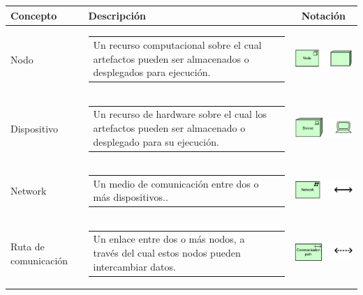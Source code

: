 \begin{longtable}[c]{|p{2.55cm}|l|c|}
	\hline
	\textbf{Concepto} 			& \textbf{Descripción}                                                                                                                                            & \textbf{Notación} \\ \hline
	\endhead
	Nodo  						& \begin{tabular}[c]{p{7cm}@{}l@{}}Un recurso computacional sobre el cual artefactos pueden ser almacenados o desplegados para ejecución.\end{tabular}                                                    & \includegraphics[width=35mm]{arquitectura/adm_lenguaje/imgs/technology/Node}           \\ \hline
	Dispositivo    				& \begin{tabular}[c]{p{7cm}@{}l@{}}Un recurso de hardware sobre el cual los artefactos pueden ser almacenado o desplegado para su ejecución.\end{tabular} & \includegraphics[width=35mm]{arquitectura/adm_lenguaje/imgs/technology/Device}          \\ \hline
	Network  					& \begin{tabular}[c]{p{7cm}@{}l@{}}Un medio de comunicación entre dos o más dispositivos..\end{tabular} & \includegraphics[width=35mm]{arquitectura/adm_lenguaje/imgs/technology/Network}          \\ \hline
	Ruta de comunicación		& \begin{tabular}[c]{p{7cm}@{}l@{}}Un enlace entre dos o más nodos, a través del cual estos nodos pueden intercambiar datos.\end{tabular} & \includegraphics[width=35mm]{arquitectura/adm_lenguaje/imgs/technology/CommunicationPath}          \\ \hline

\end{longtable}

